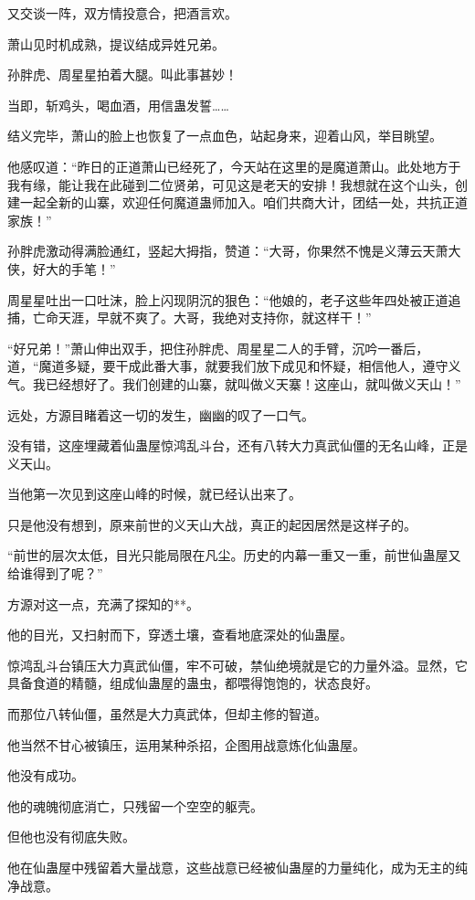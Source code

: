 \begin{this_body}
又交谈一阵，双方情投意合，把酒言欢。

萧山见时机成熟，提议结成异姓兄弟。

孙胖虎、周星星拍着大腿。叫此事甚妙！

当即，斩鸡头，喝血酒，用信蛊发誓……

结义完毕，萧山的脸上也恢复了一点血色，站起身来，迎着山风，举目眺望。

他感叹道：“昨日的正道萧山已经死了，今天站在这里的是魔道萧山。此处地方于我有缘，能让我在此碰到二位贤弟，可见这是老天的安排！我想就在这个山头，创建一起全新的山寨，欢迎任何魔道蛊师加入。咱们共商大计，团结一处，共抗正道家族！”

孙胖虎激动得满脸通红，竖起大拇指，赞道：“大哥，你果然不愧是义薄云天萧大侠，好大的手笔！”

周星星吐出一口吐沫，脸上闪现阴沉的狠色：“他娘的，老子这些年四处被正道追捕，亡命天涯，早就不爽了。大哥，我绝对支持你，就这样干！”

“好兄弟！”萧山伸出双手，把住孙胖虎、周星星二人的手臂，沉吟一番后，道，“魔道多疑，要干成此番大事，就要我们放下成见和怀疑，相信他人，遵守义气。我已经想好了。我们创建的山寨，就叫做义天寨！这座山，就叫做义天山！”

远处，方源目睹着这一切的发生，幽幽的叹了一口气。

没有错，这座埋藏着仙蛊屋惊鸿乱斗台，还有八转大力真武仙僵的无名山峰，正是义天山。

当他第一次见到这座山峰的时候，就已经认出来了。

只是他没有想到，原来前世的义天山大战，真正的起因居然是这样子的。

“前世的层次太低，目光只能局限在凡尘。历史的内幕一重又一重，前世仙蛊屋又给谁得到了呢？”

方源对这一点，充满了探知的**。

他的目光，又扫射而下，穿透土壤，查看地底深处的仙蛊屋。

惊鸿乱斗台镇压大力真武仙僵，牢不可破，禁仙绝境就是它的力量外溢。显然，它具备食道的精髓，组成仙蛊屋的蛊虫，都喂得饱饱的，状态良好。

而那位八转仙僵，虽然是大力真武体，但却主修的智道。

他当然不甘心被镇压，运用某种杀招，企图用战意炼化仙蛊屋。

他没有成功。

他的魂魄彻底消亡，只残留一个空空的躯壳。

但他也没有彻底失败。

他在仙蛊屋中残留着大量战意，这些战意已经被仙蛊屋的力量纯化，成为无主的纯净战意。


\end{this_body}
